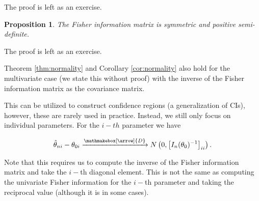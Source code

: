 \documentclass{book}
\theoremstyle{plain}%
\newtheorem{proposition}{Proposition}[section]
\theoremstyle{definition}
\newlength{\arrow}
\newcommand*{\myrightarrow}[1]{\xrightarrow{\mathmakebox[\arrow]{#1}}}
\begin{document}
The proof is left as an exercise.

\begin{proposition}
The Fisher information matrix is symmetric and positive semi-definite.
\label{prop:fipsd}
\end{proposition}

The proof is left as an exercise.

Theorem \ref{thm:normality} and Corollary \ref{cor:normality} also hold for the multivariate case (we state this without proof) with the inverse of the Fisher information matrix as the covariance matrix.

This can be utilized to construct confidence regions (a generalization of CIs), however, these are rarely used in practice. Instead, we still only focus on individual parameters. For the $i-th$ parameter we have

$$\hat{\theta}_{ni} - \theta_{0i} \myrightarrow{D} N\left(0, \left[I_n(\theta_0)^{-1}\right]_{ii}\right).$$

Note that this requires us to compute the inverse of the Fisher information matrix and take the $i-$th diagonal element. This is not the same as computing the univariate Fisher information for the $i-$th parameter and taking the reciprocal value (although it is in some cases).
\end{document}
